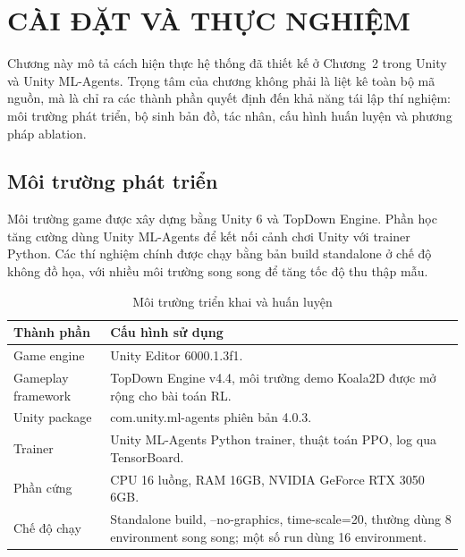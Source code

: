 \clearpage
{}

\setcounter{chapter}{2}
\chapter[CÀI ĐẶT VÀ THỰC NGHIỆM]{CÀI ĐẶT VÀ THỰC NGHIỆM}

Chương này mô tả cách hiện thực hệ thống đã thiết kế ở Chương~2 trong Unity và Unity ML-Agents. Trọng tâm của chương không phải là liệt kê toàn bộ mã nguồn, mà là chỉ ra các thành phần quyết định đến khả năng tái lập thí nghiệm: môi trường phát triển, bộ sinh bản đồ, tác nhân, cấu hình huấn luyện và phương pháp ablation.

\section{Môi trường phát triển}

Môi trường game được xây dựng bằng Unity 6 và TopDown Engine. Phần học tăng cường dùng Unity ML-Agents để kết nối cảnh chơi Unity với trainer Python. Các thí nghiệm chính được chạy bằng bản build standalone ở chế độ không đồ họa, với nhiều môi trường song song để tăng tốc độ thu thập mẫu.

\begin{table}[H]
    \centering
    \small
    \caption{Môi trường triển khai và huấn luyện}
    \label{tab:development_environment}
    \begin{tabular}{|p{5cm}|p{8cm}|}
        \hline
        \textbf{Thành phần} & \textbf{Cấu hình sử dụng} \\
        \hline
        Game engine & Unity Editor 6000.1.3f1. \\
        \hline
        Gameplay framework & TopDown Engine v4.4, môi trường demo Koala2D được mở rộng cho bài toán RL. \\
        \hline
        Unity package & com.unity.ml-agents phiên bản 4.0.3. \\
        \hline
        Trainer & Unity ML-Agents Python trainer, thuật toán PPO, log qua TensorBoard. \\
        \hline
        Phần cứng & CPU 16 luồng, RAM 16GB, NVIDIA GeForce RTX 3050 6GB. \\
        \hline
        Chế độ chạy & Standalone build, --no-graphics, time-scale=20, thường dùng 8 environment song song; một số run dùng 16 environment. \\
        \hline
    \end{tabular}
\end{table}

